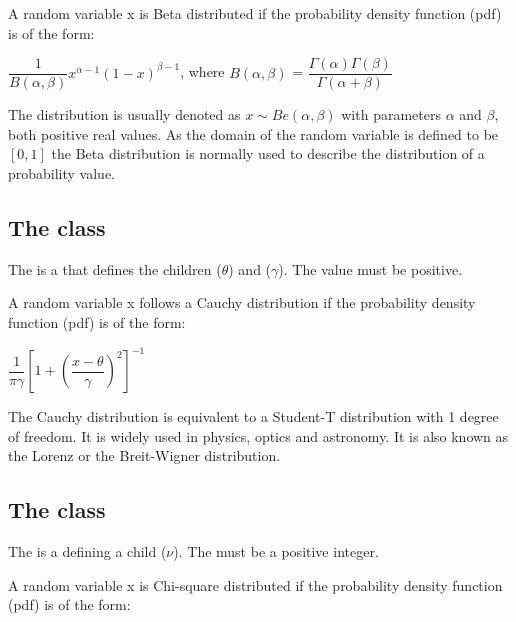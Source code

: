 A random variable x is Beta distributed if the probability density function (pdf) is of the form:

\begin{center}
$\dfrac{1}{B\left(\alpha,\beta\right)}x^{\alpha-1}\left(1-x\right)^{\beta-1}$, where $B\left(\alpha,\beta\right)$ = $\dfrac{\Gamma\left(\alpha\right)\Gamma\left(\beta\right)}{\Gamma\left(\alpha+\beta\right)}$
\end{center}

The distribution is usually denoted as $x\sim Be\left(\alpha,\beta\right)$ with parameters $\alpha$ and $\beta$, both positive real values. As the domain of the random variable is defined to be $[0,1]$ the Beta distribution is normally used to describe the distribution of a probability value.

\subsection{The  class}
\label{CauchyDistribution-class}
\label{cauchydistribution-class}

The \CauchyDistribution is a \ContinuousUnivariateDistribution that defines the \UncertValue children  ($\theta$) and  ($\gamma$).  The  value must be positive.

A random variable x follows a Cauchy distribution if the probability density function (pdf) is of the form:

\begin{center}
$\dfrac{1}{\pi\gamma}\left[1+\left(\dfrac{x-\theta}{\gamma}\right)^2\right]^{-1}$
\end{center}

The Cauchy distribution is equivalent to a Student-T distribution with 1 degree of freedom. It is widely used in physics, optics and astronomy. It is also known as the Lorenz or the Breit-Wigner distribution.

\subsection{The  class}
\label{ChiSquareDistribution-class}
\label{chisquaredistribution-class}

The \ChiSquareDistribution is a \ContinuousUnivariateDistribution defining a \UncertValue child  ($\nu$).  The  must be a positive integer.

A random variable x is Chi-square distributed if the probability density function (pdf) is of the form:

